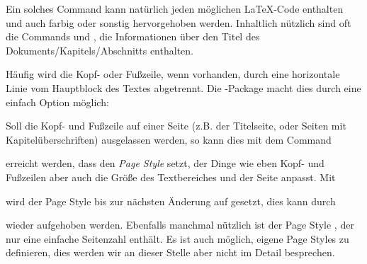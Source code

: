 Ein solches Command kann natürlich jeden möglichen \LaTeX{}-Code enthalten und auch farbig oder sonstig hervorgehoben werden.
Inhaltlich nützlich sind oft die Commands  und , die Informationen über den Titel des Dokuments/Kapitels/Abschnitts enthalten.

Häufig wird die Kopf- oder Fußzeile, wenn vorhanden, durch eine horizontale Linie vom Hauptblock des Textes abgetrennt.
Die -Package macht dies durch eine einfach Option möglich:
\begin{latexlisting}
\usepackage[footsepline, headsepline]{scrlayer-scrpage}	
\end{latexlisting}
Soll die Kopf- und Fußzeile auf einer Seite (z.B. der Titelseite, oder Seiten mit Kapitelüberschriften) ausgelassen werden, so kann dies mit dem Command
\begin{latexlisting}
	\thispagestyle{empty}
\end{latexlisting}
erreicht werden, dass den \emph{Page Style} setzt, der Dinge wie eben Kopf- und Fußzeilen aber auch die Größe des Textbereiches und der Seite anpasst. Mit
\begin{latexlisting}
	\pagestyle{empty}
\end{latexlisting}
wird der Page Style bis zur nächsten Änderung auf  gesetzt, dies kann durch
\begin{latexlisting}
	\pagestyle{scrheadings}
\end{latexlisting}
wieder aufgehoben werden.
Ebenfalls manchmal nützlich ist der Page Style , der nur eine einfache Seitenzahl enthält.
Es ist auch möglich, eigene Page Styles zu definieren, dies werden wir an dieser Stelle aber nicht im Detail besprechen.


